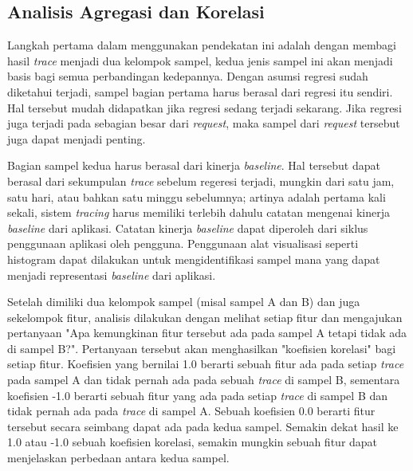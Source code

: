 
\subsection{Analisis Agregasi dan Korelasi}
\label{approach-corr}

Langkah pertama dalam menggunakan pendekatan ini adalah dengan membagi hasil \textit{trace} menjadi dua kelompok sampel, kedua jenis sampel ini akan menjadi basis bagi semua perbandingan kedepannya. Dengan asumsi regresi sudah diketahui terjadi, sampel bagian pertama harus berasal dari regresi itu sendiri. Hal tersebut mudah didapatkan jika regresi sedang terjadi sekarang. Jika regresi juga terjadi pada sebagian besar dari \textit{request}, maka sampel dari \textit{request} tersebut juga dapat menjadi penting. 

Bagian sampel kedua harus berasal dari kinerja \textit{baseline}. Hal tersebut dapat berasal dari sekumpulan \textit{trace} sebelum regeresi terjadi, mungkin dari satu jam, satu hari, atau bahkan satu minggu sebelumnya; artinya adalah pertama kali sekali, sistem \textit{tracing} harus memiliki terlebih dahulu catatan mengenai kinerja \textit{baseline} dari aplikasi. Catatan kinerja \textit{baseline} dapat diperoleh dari siklus penggunaan aplikasi oleh pengguna. Penggunaan alat visualisasi seperti histogram dapat dilakukan untuk mengidentifikasi sampel mana yang dapat menjadi representasi \textit{baseline} dari aplikasi.

Setelah dimiliki dua kelompok sampel (misal sampel A dan B) dan juga sekelompok fitur, analisis dilakukan dengan melihat setiap fitur dan mengajukan pertanyaan "Apa kemungkinan fitur tersebut ada pada sampel A tetapi tidak ada di sampel B?". Pertanyaan tersebut akan menghasilkan "koefisien korelasi" bagi setiap fitur. Koefisien yang bernilai 1.0 berarti sebuah fitur ada pada setiap \textit{trace} pada sampel A dan tidak pernah ada pada sebuah \textit{trace} di sampel B, sementara koefisien -1.0 berarti sebuah fitur yang ada pada setiap \textit{trace} di sampel B dan tidak pernah ada pada \textit{trace} di sampel A. Sebuah koefisien 0.0 berarti fitur tersebut secara seimbang dapat ada pada kedua sampel. Semakin dekat hasil ke 1.0 atau -1.0 sebuah koefisien korelasi, semakin mungkin sebuah fitur dapat menjelaskan perbedaan antara kedua sampel.

